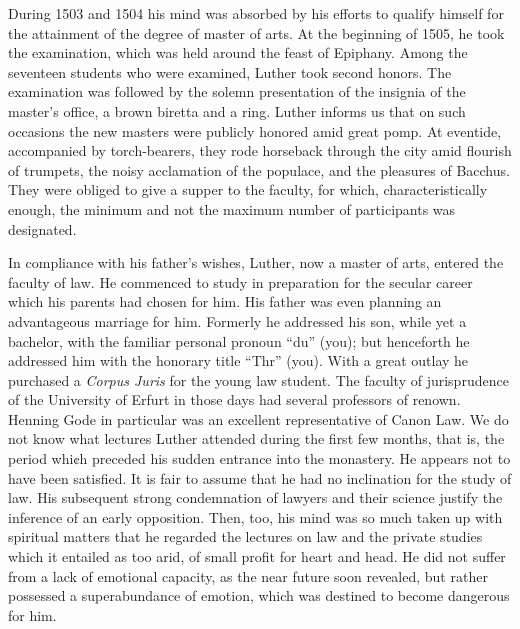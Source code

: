 During 1503 and 1504 his mind was absorbed by his efforts to
qualify himself for the attainment of the degree of master of arts.
At the beginning of 1505, he took the examination, which was
held around the feast of Epiphany. Among the seventeen students
who were examined, Luther took second honors. The examination
was followed by the solemn presentation of the insignia of the
master’s office, a brown biretta and a ring. Luther informs us that
on such occasions the new masters were publicly honored amid great
pomp. At eventide, accompanied by torch-bearers, they rode horseback through the city amid flourish of trumpets, the noisy acclamation of the populace, and the pleasures of Bacchus. They were
obliged to give a supper to the faculty, for which, characteristically
enough, the minimum and not the maximum number of participants
was designated.

In compliance with his father’s wishes, Luther, now a master of
arts, entered the faculty of law. He commenced to study in preparation
for the secular career which his parents had chosen for him.
His father was even planning an advantageous marriage for him.
Formerly he addressed his son, while yet a bachelor, with the familiar
personal pronoun “du” (you); but henceforth he addressed him with
the honorary title “Thr” (you). With a great outlay he purchased
a \textit{Corpus Juris} for the young law student.
The faculty of jurisprudence of the University of Erfurt in
those days had several professors of renown. Henning Gode in
particular was an excellent representative of Canon Law. We do
not know what lectures Luther attended during the first few
months, that is, the period whi¢h preceded his sudden entrance into
the monastery. He appears not to have been satisfied. It is fair to
assume that he had no inclination for the study of law. His subsequent
strong condemnation of lawyers and their science justify the
inference of an early opposition. Then, too, his mind was so much
taken up with spiritual matters that he regarded the lectures on
law and the private studies which it entailed as too arid, of small
profit for heart and head. He did not suffer from a lack of emotional
capacity, as the near future soon revealed, but rather possessed a
superabundance of emotion, which was destined to become dangerous
for him.

